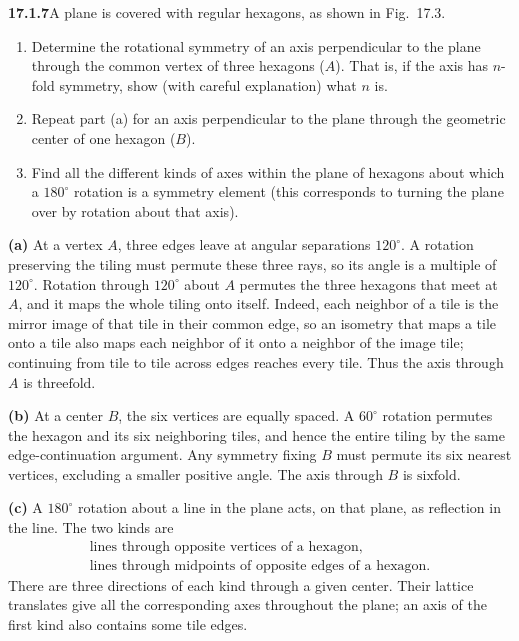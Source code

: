 \par\bigskip
\noindent\textbf{17.1.7}\quad A plane is covered with regular
hexagons, as shown in Fig.~17.3.
\begin{enumerate}
\item[(a)] Determine the rotational symmetry of an axis perpendicular
to the plane through the common vertex of three hexagons ($A$). That
is, if the axis has $n$-fold symmetry, show (with careful
explanation) what $n$ is.
\item[(b)] Repeat part (a) for an axis perpendicular to the plane
through the geometric center of one hexagon ($B$).
\item[(c)] Find all the different kinds of axes within the plane of
hexagons about which a $180^{\circ}$ rotation is a symmetry element
(this corresponds to turning the plane over by rotation about that
axis).
\end{enumerate}
\solution
\textbf{(a)} At a vertex $A$, three edges leave at angular
separations $120^\circ$. A rotation preserving the tiling must
permute these three rays, so its angle is a multiple of
$120^\circ$. Rotation through $120^\circ$ about $A$ permutes the
three hexagons that meet at $A$, and it maps the whole tiling onto
itself. Indeed, each neighbor of a tile is the mirror image of that
tile in their common edge, so an isometry that maps a tile onto a
tile also maps each neighbor of it onto a neighbor of the image
tile; continuing from tile to tile across edges reaches every tile.
Thus the axis through $A$ is $\boxed{\text{threefold}}$.

\textbf{(b)} At a center $B$, the six vertices are equally spaced.
A $60^\circ$ rotation permutes the hexagon and its six neighboring
tiles, and hence the entire tiling by the same edge-continuation
argument. Any symmetry fixing $B$ must permute its six nearest
vertices, excluding a smaller positive angle.
The axis through $B$ is $\boxed{\text{sixfold}}$.

\textbf{(c)} A $180^\circ$ rotation about a line in the plane acts,
on that plane, as reflection in the line. The two kinds are
\[
\boxed{\begin{array}{l}
\text{lines through opposite vertices of a hexagon,}\\
\text{lines through midpoints of opposite edges of a hexagon.}
\end{array}}
\]
There are three directions of each kind through a given center.
Their lattice translates give all the corresponding axes throughout
the plane; an axis of the first kind also contains some tile edges.

